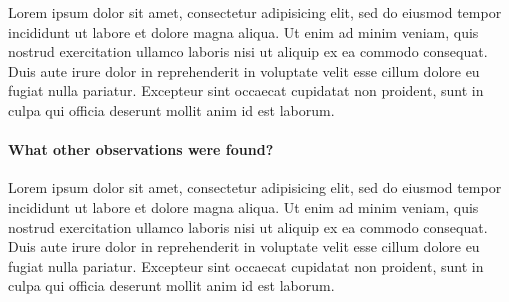 Lorem ipsum dolor sit amet, consectetur adipisicing elit, sed do eiusmod tempor incididunt ut labore et dolore magna aliqua. Ut enim ad minim veniam, quis nostrud exercitation ullamco laboris nisi ut aliquip ex ea commodo consequat. Duis aute irure dolor in reprehenderit in voluptate velit esse cillum dolore eu fugiat nulla pariatur. Excepteur sint occaecat cupidatat non proident, sunt in culpa qui officia deserunt mollit anim id est laborum.

\paragraph{What other observations were found?}
Lorem ipsum dolor sit amet, consectetur adipisicing elit, sed do eiusmod tempor incididunt ut labore et dolore magna aliqua. Ut enim ad minim veniam, quis nostrud exercitation ullamco laboris nisi ut aliquip ex ea commodo consequat. Duis aute irure dolor in reprehenderit in voluptate velit esse cillum dolore eu fugiat nulla pariatur. Excepteur sint occaecat cupidatat non proident, sunt in culpa qui officia deserunt mollit anim id est laborum.